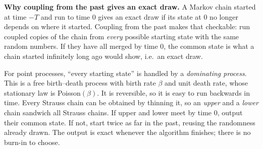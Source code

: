 \documentclass[10pt,a4paper]{article}
\newenvironment{keybox}{\par\smallskip\noindent\begin{lrbox}{\keyboxsave}\begin{minipage}{\dimexpr\linewidth-2\fboxsep-2\fboxrule\relax}\small\setlength{\parskip}{0.4em}}{\end{minipage}\end{lrbox}\fbox{\usebox{\keyboxsave}}\par\smallskip}
\begin{document}
\begin{keybox}
\textbf{Why coupling from the past gives an exact draw.} A Markov chain started at time $-T$ and run to time $0$ gives an exact draw if its state at $0$ no longer depends on where it started. Coupling from the past makes that checkable: run coupled copies of the chain from \emph{every} possible starting state with the same random numbers. If they have all merged by time $0$, the common state is what a chain started infinitely long ago would show, i.e.\ an exact draw.

For point processes, ``every starting state'' is handled by a \emph{dominating process}. This is a free birth--death process with birth rate $\beta$ and unit death rate, whose stationary law is Poisson$(\beta)$. It is reversible, so it is easy to run backwards in time. Every Strauss chain can be obtained by thinning it, so an \emph{upper} and a \emph{lower} chain sandwich all Strauss chains. If upper and lower meet by time $0$, output their common state. If not, start twice as far in the past, reusing the randomness already drawn. The output is exact whenever the algorithm finishes; there is no burn-in to choose.
\end{keybox}
\end{document}
